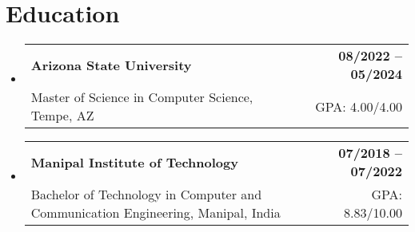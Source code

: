 \documentclass[letterpaper,11pt]{article}
\makeatletter
\newcommand{\educationSubheading}[4]{
  \vspace{-2pt}\item
    \begin{tabular*}{1.0\textwidth}[t]{l@{\extracolsep{\fill}}r}
      \textbf{\small #1} & \textbf{\small #2} \\
      {\small#3} & {\small #4} \\
    \end{tabular*}\vspace{-7pt}
}
\newcommand{\resumeSubHeadingListStart}{\begin{itemize}[leftmargin=0pt, label={}]}
\newcommand{\resumeSubHeadingListEnd}{\end{itemize}}
\makeatother
\begin{document}
 \vspace{-15pt}

\section{Education}
  \resumeSubHeadingListStart
    \educationSubheading
      {Arizona State University}{08/2022 -- 05/2024}
      {Master of Science in Computer Science, Tempe, AZ}{GPA: 4.00/4.00}

    \educationSubheading
      {Manipal Institute of Technology}{07/2018 -- 07/2022}
      {Bachelor of Technology in Computer and Communication Engineering, Manipal, India}{GPA: 8.83/10.00}
  \resumeSubHeadingListEnd
\end{document}
